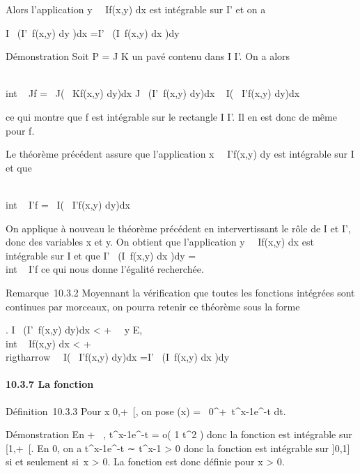Alors l'application
y\mapsto~\int ~
If(x,y) dx est intégrable sur I' et on a

\int  I~\left
(\int  I'~f(x,y) dy\right
)dx =\int  I'~\left
(\int  I~f(x,y) dx\right
)dy

Démonstration Soit P = J \times K un pavé contenu dans I \times I'. On a alors

\int  \\int ~
J\timesK\textbar{}f\textbar{} =\int ~
J\left (\int ~
K\textbar{}f(x,y)\textbar{} dy\right )dx
\leq\int  J~\left
(\int  I'~\textbar{}f(x,y)\textbar{}
dy\right )dx \leq\int ~
I\left (\int ~
I'\textbar{}f(x,y)\textbar{} dy\right )dx

ce qui montre que \textbar{}f\textbar{} est intégrable sur le rectangle
I \times I'. Il en est donc de même pour f.

Le théorème précédent assure que l'application
x\mapsto~\int ~
I'f(x,y) dy est intégrable sur I et que

\int  \\int ~
I\timesI'f =\int ~
I\left (\int ~
I'f(x,y) dy\right )dx

On applique à nouveau le théorème précédent en intervertissant le rôle
de I et I', donc des variables x et y. On obtient que l'application
y\mapsto~\int ~
If(x,y) dx est intégrable sur I et que
\int  I'~\left
(\int  I~f(x,y) dx\right
)dy =\int  \\int ~
I\timesI'f ce qui nous donne l'égalité recherchée.

Remarque~10.3.2 Moyennant la vérification que toutes les fonctions
intégrées sont continues par morceaux, on pourra retenir ce théorème
sous la forme

\left .\array
\int  I~\left
(\int  I'~\textbar{}f(x,y)\textbar{}
dy\right )dx \textless{} +\infty~ \cr
\forall~y \in E, \\int ~
I\textbar{}f(x,y)\textbar{} dx \textless{} +\infty~ 
\right \\rigtharrow~\int ~
I\left (\int ~
I'f(x,y) dy\right )dx
=\int  I'~\left
(\int  I~f(x,y) dx\right
)dy

\paragraph{10.3.7 La fonction \Gamma}

Définition~10.3.3 Pour x \in{]}0,+\infty~{[}, on pose \Gamma(x)
=\int ~
0^+\infty~t^x-1e^-t dt.

Démonstration En + \infty~, t^x-1e^-t = o( 1
\over t^2 ) donc la fonction est intégrable
sur {[}1,+\infty~{[}. En 0, on a t^x-1e^-t ∼
t^x-1 \textgreater{} 0 donc la fonction est intégrable sur
{]}0,1{]} si et seulement si~x \textgreater{} 0. La fonction \Gamma est donc
définie pour x \textgreater{} 0.

